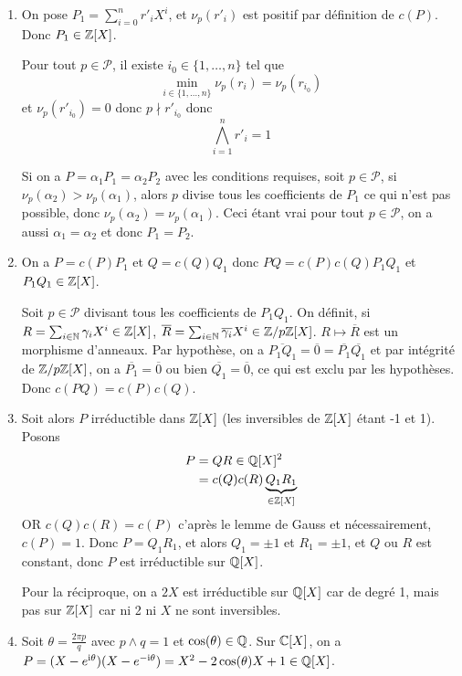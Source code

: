 \begin{solution}
	\phantom{}
	\begin{enumerate}
		\item On pose $P_{1}=\sum_{i=0}^{n}r'_{i}X^{i}$, et $\nu_{p}(r'_{i})$ est positif par définition de $c(P)$. Donc $P_{1}\in\mathbb{Z}[X]$.
		
		Pour tout $p\in\mathcal{P}$, il existe $i_{0}\in\{1,\dots,n\}$ tel que 
		$$\min\limits_{i\in\{1,\dots,n\}}\nu_{p}(r_{i})=\nu_{p}(r_{i_{0}})$$
		et $\nu_{p}(r'_{i_{0}})=0$ donc $p\nmid r'_{i_{0}}$ donc 
		$$\bigwedge_{i=1}^{n}r'_{i}=1$$

		Si on a $P=\alpha_{1}P_{1}=\alpha_{2}P_{2}$ avec les conditions requises, soit $p\in\mathcal{P}$, si $\nu_{p}(\alpha_{2})>\nu_{p}(\alpha_{1})$, alors $p$ divise tous les coefficients de $P_{1}$ ce qui n'est pas possible, donc $\nu_{p}(\alpha_{2})=\nu_{p}(\alpha_{1})$. Ceci étant vrai pour tout $p\in\mathcal{P}$, on a aussi $\alpha_{1}=\alpha_{2}$ et donc $P_{1}=P_{2}$.

		\item On a $P=c(P)P_{1}$ et $Q=c(Q)Q_{1}$ donc $PQ=c(P)c(Q)P_{1}Q_{1}$ et $P_{1}Q_{1}\in\mathbb{Z}[X]$.
		
		Soit $p\in\mathcal{P}$ divisant tous les coefficients de $P_{1}Q_{1}$. On définit, si $R=\sum_{i\in\mathbb{N}}\gamma_{i}X^{i}\in\mathbb{Z}[X]$, $\overline{R}=\sum_{i\in\mathbb{N}}\overline{\gamma_{i}}X^{i}\in\mathbb{Z}/p\mathbb{Z}[X]$. $R\mapsto\overline{R}$ est un morphisme d'anneaux. Par hypothèse, on a $\overline{P_{1}Q_{1}}=\overline{0}=\overline{P_{1}}\overline{Q_{1}}$ et par intégrité de $\mathbb{Z}/p\mathbb{Z}[X]$, on a $\overline{P_{1}}=\overline{0}$ ou bien $\overline{Q_{1}}=\overline{0}$, ce qui est exclu par les hypothèses. Donc $c(PQ)=c(P)c(Q)$.

		\item 
		Soit alors $P$ irréductible dans $\mathbb{Z}[X]$ (les inversibles de $\mathbb{Z}[X]$ étant -1 et 1). Posons 
		\begin{align*}
			P
			&=QR\in\mathbb{Q}[X]^{2}\\
			&=c(Q)c(R)\underbrace{Q_{1}R_{1}}_{\in\mathbb{Z}[X]}
		\end{align*}
		OR $c(Q)c(R)=c(P)$ c'après le lemme de Gauss et nécessairement, $c(P)=1$. Donc $P=Q_{1}R_{1}$, et alors $Q_{1}=\pm 1$ et $R_{1}=\pm 1$, et $Q$ ou $R$ est constant, donc $P$ est irréductible sur $\mathbb{Q}[X]$.

		Pour la réciproque, on a $2X$ est irréductible sur $\mathbb{Q}[X]$ car de degré 1, mais pas sur $\mathbb{Z}[X]$ car ni 2 ni $X$ ne sont inversibles.

		\item Soit $\theta=\frac{2\pi p}{q}$ avec $p\wedge q=1$ et $\cos(\theta)\in\mathbb{Q}$. Sur $\mathbb{C}[X]$, on a $P=(X-e^{\mathrm{i}\theta})(X-e^{-\mathrm{i}\theta})=X^{2}-2\cos(\theta)X+1\in\mathbb{Q}[X]$.
		

\end{enumerate}
\end{solution}
